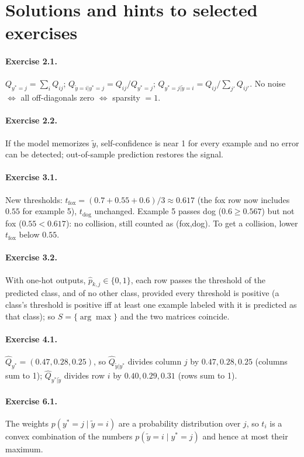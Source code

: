 \documentclass[11pt,a4paper]{report}
\newcommand{\1}{\mathbf 1}
\theoremstyle{definition}
\theoremstyle{plain}
\theoremstyle{remark}
\begin{document}
\section{Solutions and hints to selected exercises}
\paragraph{Exercise 2.1.} $Q_{y^*=j}=\sum_iQ_{ij}$; $Q_{\tilde y=i|y^*=j}=Q_{ij}/Q_{y^*=j}$; $Q_{y^*=j|\tilde y=i}=Q_{ij}/\sum_{j'}Q_{ij'}$. No noise $\iff$ all off-diagonals zero $\iff$ sparsity $=1$.
\paragraph{Exercise 2.2.} If the model memorizes $\tilde y$, self-confidence is near 1 for every example and no error can be detected; out-of-sample prediction restores the signal.
\paragraph{Exercise 3.1.} New thresholds: $t_{\text{fox}}=(0.7+0.55+0.6)/3\approx0.617$ (the fox row now includes $0.55$ for example 5), $t_{\text{dog}}$ unchanged. Example 5 passes dog ($0.6\ge0.567$) but not fox ($0.55<0.617$): no collision, still counted as (fox,dog). To get a collision, lower $t_{\text{fox}}$ below $0.55$.
\paragraph{Exercise 3.2.} With one-hot outputs, $\hat p_{k,j}\in\{0,1\}$, each row passes the threshold of the predicted class, and of no other class, provided every threshold is positive (a class's threshold is positive iff at least one example labeled with it is predicted as that class); so $S=\{\arg\max\}$ and the two matrices coincide.
\paragraph{Exercise 4.1.} $\hat Q_{y^*}=(0.47,0.28,0.25)$, so $\hat Q_{\tilde y|y^*}$ divides column $j$ by $0.47,0.28,0.25$ (columns sum to 1); $\hat Q_{y^*|\tilde y}$ divides row $i$ by $0.40,0.29,0.31$ (rows sum to 1).
\paragraph{Exercise 6.1.} The weights $p(y^*=j\mid\tilde y=i)$ are a probability distribution over $j$, so $t_i$ is a convex combination of the numbers $p(\tilde y=i\mid y^*=j)$ and hence at most their maximum.
\end{document}
